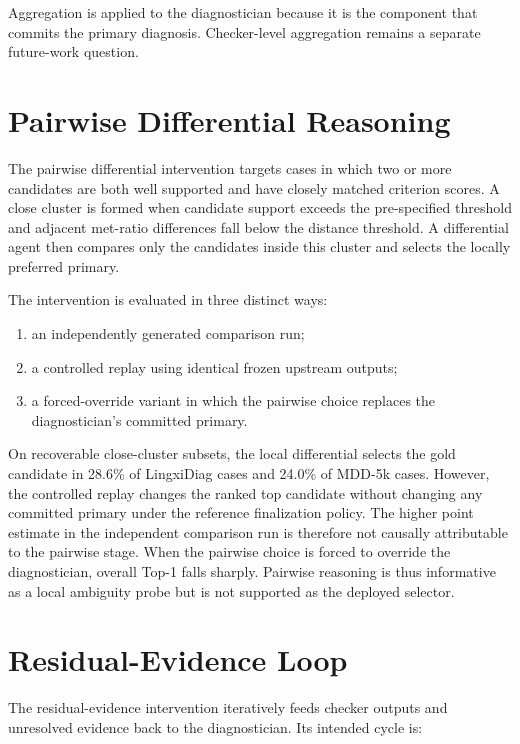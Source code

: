 Aggregation is applied to the diagnostician because it is the component that
commits the primary diagnosis. Checker-level aggregation remains a separate
future-work question.

\section{Pairwise Differential Reasoning}
\label{app:pairwise}

The pairwise differential intervention targets cases in which two or more
candidates are both well supported and have closely matched criterion scores.
A close cluster is formed when candidate support exceeds the pre-specified
threshold and adjacent met-ratio differences fall below the distance
threshold. A differential agent then compares only the candidates inside this
cluster and selects the locally preferred primary.

The intervention is evaluated in three distinct ways:

\begin{enumerate}
  \item an independently generated comparison run;
  \item a controlled replay using identical frozen upstream outputs;
  \item a forced-override variant in which the pairwise choice replaces the
        diagnostician's committed primary.
\end{enumerate}

On recoverable close-cluster subsets, the local differential selects the gold
candidate in 28.6\% of LingxiDiag cases and 24.0\% of MDD-5k cases. However,
the controlled replay changes the ranked top candidate without changing any
committed primary under the reference finalization policy. The higher point
estimate in the independent comparison run is therefore not causally
attributable to the pairwise stage. When the pairwise choice is forced to
override the diagnostician, overall Top-1 falls sharply. Pairwise reasoning is
thus informative as a local ambiguity probe but is not supported as the
deployed selector.

\section{Residual-Evidence Loop}
\label{app:residual}

The residual-evidence intervention iteratively feeds checker outputs and
unresolved evidence back to the diagnostician. Its intended cycle is:

